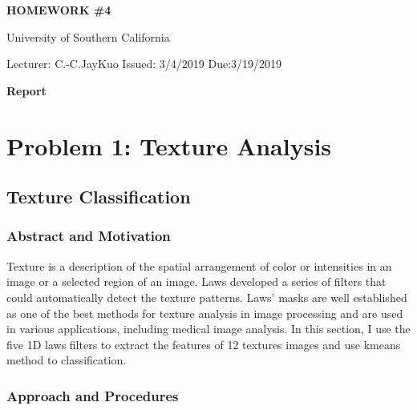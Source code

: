 \documentclass[11pt]{article}
\newlength{\toppush}
\newcommand{\htitle}[4]{\noindent\vspace*{-\toppush}\newline\parbox{6.5in}
{\begin{center} {\bf HOMEWORK \#4}\end{center}
\begin{center} {University of Southern California}\end{center}
#1  \hfill  
 #3 \hfill #4 \newline
\mbox{}\hrulefill\mbox{}}\vspace*{1ex}\mbox{}\newline
\begin{center}{\Large\bf #2}\end{center}}
\begin{document}
\htitle{Lecturer: C.-C.JayKuo}{Report}{Issued: 3/4/2019}{Due:3/19/2019}


\section{Problem 1: Texture Analysis}
\subsection{Texture Classification}
\subsubsection{Abstract and Motivation}
Texture is a description of the spatial arrangement of color or intensities in an image or a selected region of an image. Laws developed a series of filters that could automatically detect the texture patterns. Laws' masks are well established as one of the best methods for texture analysis in image processing and are used in various applications, including medical image analysis. In this section, I use the five 1D laws filters to extract the features of 12 textures images and use kmeans method to classification.\par
\subsubsection{Approach and Procedures}
\end{document}
